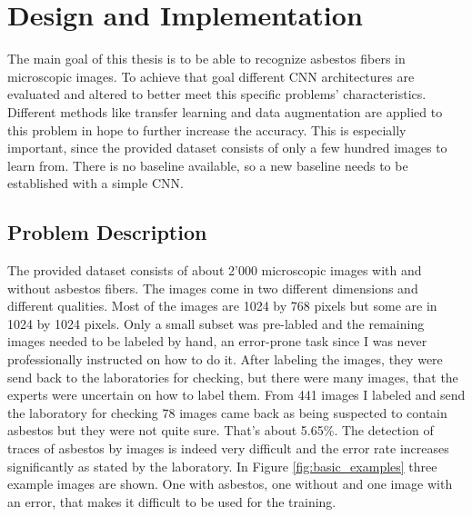 \chapter{Design and Implementation}


The main goal of this thesis is to be able to recognize asbestos fibers in microscopic images. To achieve that goal different CNN architectures are evaluated and altered to better meet this specific problems' characteristics. Different methods like transfer learning and data augmentation are applied to this problem in hope to further increase the accuracy. This is especially important, since the provided dataset consists of only a few hundred images to learn from. There is no baseline available, so a new baseline needs to be established with a simple CNN.

\section{Problem Description}

The provided dataset consists of about 2'000 microscopic images with and without asbestos fibers. The images come in two different dimensions and different qualities. Most of the images are 1024 by 768 pixels but some are in 1024 by 1024 pixels. Only a small subset was pre-labled and the remaining images needed to be labeled by hand, an error-prone task since I was never professionally instructed on how to do it. After labeling the images, they were send back to the laboratories for checking, but there were many images, that the experts were uncertain on how to label them. From 441 images I labeled and send the laboratory for checking 78 images came back as being suspected to contain asbestos but they were not quite sure. That's about 5.65\%. The detection of traces of asbestos by images is indeed very difficult and the error rate increases significantly as stated by the laboratory. In Figure \ref{fig:basic_examples} three example images are shown. One with asbestos, one without and one image with an error, that makes it difficult to be used for the training.

